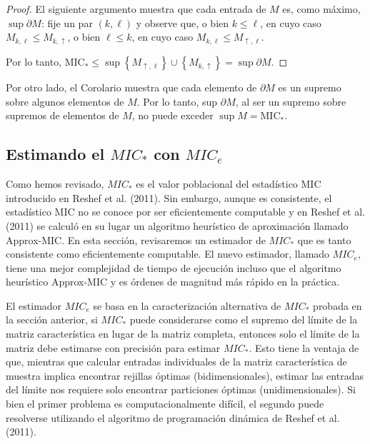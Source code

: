 	\begin{proof}
		El siguiente argumento muestra que cada entrada de $M$ es, como m\'aximo, $\sup \partial M$: fije un par $(k, \ell)$ y observe que, o bien $k \leq \ell$, en cuyo caso $M_{k, \ell} \leq M_{k, \uparrow}$, o bien $\ell \leq k$, en cuyo caso $M_{k, \ell} \leq M_{\uparrow, \ell}$. 
		
		Por lo tanto, $\mathrm{MIC}_* \leq \sup \left\{M_{\uparrow, \ell}\right\} \cup\left\{M_{k, \uparrow}\right\}=\sup \partial M$.
	\end{proof}
	
	Por otro lado, el Corolario muestra que cada elemento de $\partial M$ es un supremo sobre algunos elementos de $M$. Por lo tanto, sup $\partial M$, al ser un supremo sobre supremos de elementos de $M$, no puede exceder $\sup M=\mathrm{MIC}_*$.


	\subsection[Estimando el MICstar con MIC e]{Estimando el $MIC_*$ con $MIC_e$}

	Como hemos revisado, $MIC_*$ es el valor poblacional del estad\'istico MIC introducido en Reshef et al. (2011). Sin embargo, aunque es consistente, el estad\'istico MIC no se conoce por ser eficientemente computable y en Reshef et al. (2011) \cite{Reshef2011} se calcul\'o en su lugar un algoritmo heur\'istico de aproximaci\'on llamado Approx-MIC. En esta secci\'on, revisaremos un estimador de $MIC_*$ que es tanto consistente como eficientemente computable. El nuevo estimador, llamado $MIC_e$, tiene una mejor complejidad de tiempo de ejecuci\'on incluso que el algoritmo heur\'istico Approx-MIC y es \'ordenes de magnitud m\'as r\'apido en la pr\'actica.

	El estimador $MIC_e$ se basa en la caracterizaci\'on alternativa de $MIC_*$ probada en la secci\'on anterior, si $MIC_*$ puede considerarse como el supremo del l\'imite de la matriz caracter\'istica en lugar de la matriz completa, entonces solo el l\'imite de la matriz debe estimarse con precisi\'on para estimar $MIC_*$. Esto tiene la ventaja de que, mientras que calcular entradas individuales de la matriz caracter\'istica de muestra implica encontrar rejillas \'optimas (bidimensionales), estimar las entradas del l\'imite nos requiere solo encontrar particiones \'optimas (unidimensionales). Si bien el primer problema es computacionalmente dif\'icil, el segundo puede resolverse utilizando el algoritmo de programaci\'on din\'amica de Reshef et al.(2011)\cite{Reshef2011}.

